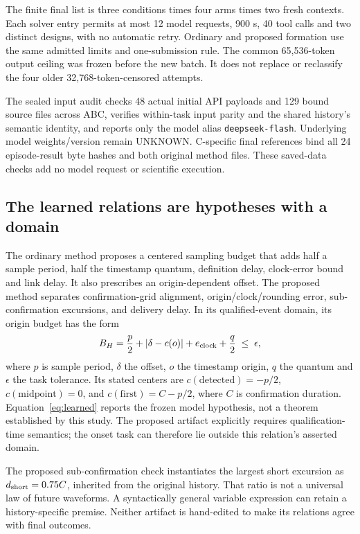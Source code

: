 The finite final list is three conditions times four arms times two fresh
contexts. Each solver entry permits at most 12 model requests, 900 s, 40 tool
calls and two distinct designs, with no automatic retry. Ordinary and proposed
formation use the same admitted limits and one-submission rule. The common
65,536-token output ceiling was frozen before the new batch. It does not replace
or reclassify the four older 32,768-token-censored attempts.

The sealed input audit checks 48 actual initial API payloads and 129 bound source
files across ABC, verifies within-task input parity and the shared history's
semantic identity, and reports only the model alias \texttt{deepseek-flash}.
Underlying model weights/version remain UNKNOWN. C-specific final references
bind all 24 episode-result byte hashes and both original method files. These
saved-data checks add no model request or scientific execution.

\subsection{The learned relations are hypotheses with a domain}
The ordinary method proposes a centered sampling budget that adds half a sample
period, half the timestamp quantum, definition delay, clock-error bound and link
delay. It also prescribes an origin-dependent offset. The proposed method
separates confirmation-grid alignment, origin/clock/rounding error,
sub-confirmation excursions, and delivery delay. In its qualified-event domain,
its origin budget has the form
\begin{equation}
 B_H=\frac{p}{2}+|\delta-c(o)|+e_{\rm clock}+\frac{q}{2}
 \;\leq\;\epsilon,
 \label{eq:learned}
\end{equation}
where $p$ is sample period, $\delta$ the offset, $o$ the timestamp origin,
$q$ the quantum and $\epsilon$ the task tolerance. Its stated centers are
$c(\mathrm{detected})=-p/2$, $c(\mathrm{midpoint})=0$, and
$c(\mathrm{first})=C-p/2$, where $C$ is confirmation duration. Equation~\ref{eq:learned}
reports the frozen model hypothesis, not a theorem established by this study.
The proposed artifact explicitly requires qualification-time semantics; the
onset task can therefore lie outside this relation's asserted domain.

The proposed sub-confirmation check instantiates the largest short excursion as
$d_{\rm short}=0.75C$, inherited from the original history. That ratio is not a
universal law of future waveforms. A syntactically general variable expression
can retain a history-specific premise. Neither artifact is hand-edited to make
its relations agree with final outcomes.


